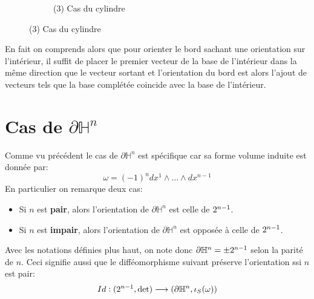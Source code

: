 \begin{figure}[htbp]
\begin{subfigure}{0.3\textwidth}
               \caption*{(3) Cas du cylindre}
            \end{subfigure}      
      \end{figure}

      En fait on comprends alors que pour orienter le bord sachant une orientation sur l'intérieur, il suffit de placer le premier vecteur de la base de l'intérieur dans la même direction que le vecteur sortant et l'orientation du bord est alors l'ajout de vecteurs tels que la base complétée coincide avec la base de l'intérieur.
   \section{Cas de \( \partial\mathbb{H}^n \)}
      Comme vu précédent le cas de \( \partial\mathbb{H}^n \) est spécifique car sa forme volume induite est donnée par:
      \[ 
         \omega = (-1)^n dx^1 \wedge \ldots \wedge {dx^{n-1}}
      \]
      En particulier on remarque deux cas:
      \begin{itemize}
         \item Si \( n \) est \textbf{pair}, alors l'orientation de \( \partial\mathbb{H}^n \) est celle de \( 2^{n-1} \).
         \item Si \( n \) est \textbf{impair}, alors l'orientation de \( \partial\mathbb{H}^n \) est opposée à celle de \( 2^{n-1} \).
      \end{itemize}
      Avec les notations définies plus haut, on note donc \( \partial\mathbb{H}^n = \pm2^{n-1} \) selon la parité de \( n \). Ceci signifie aussi que le difféomorphisme suivant préserve l'orientation ssi \( n \) est pair:
      \begin{align*}
         Id : (2^{n-1}, \text{det}) \longrightarrow (\partial\mathbb{H}^n, \iota_{S}(\omega))
      \end{align*}
